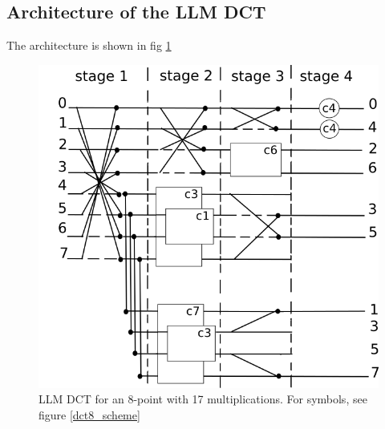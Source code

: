  \subsection{Architecture of the LLM DCT} \label{llmarch}
 The architecture is shown in fig \ref{dct8}
        \begin{figure}[h!]
        	\centering
        	\includegraphics[width=\textwidth]{imm/dct/dct8.png} 	\caption{LLM DCT for an 8-point with 17 multiplications. For symbols, see figure \ref{dct8_scheme}} 
        	\label{dct8}
        \end{figure}

